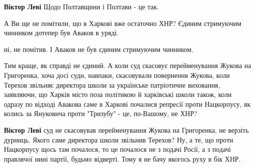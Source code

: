 \begin{itemize}
\begin{itemize}
 
\textbf{Віктор Леві} Щодо Полтавщини і Полтави - це так.
\end{itemize}

 

А Ви ще не помітили, що в Харкові вже остаточно ХНР? Єдиним стримуючим чинником
дотепер був Аваков в уряді.

\begin{itemize}
 
ні, не помітив. І Аваков не був єдиним стримуючим чинником.

 

Тим краще, як справді не єдиний. А коли суд скасовує перейменування Жукова на
Григоренка, хоча досі суди, навпаки, скасовували повернення Жукова, коли
Терехов звільняє директора школи за українське патріотичне виховання,
заявляючи, що Харків місто поза політикою й харківські школи також, коли одразу
по відході Авакова саме в Харкові почалися репресії проти Нацкорпусу, як колись
за Януковича проти "Тризубу" - це, по-Вашому, не ХНР?

 
\textbf{Віктор Леві} суд не скасовував перейменування Жукова на Григоренка, не
верзіть дурниць. Якого саме директора школи звільнив Терехов? Ну, а те, що
проти Нацкорпусу щось там почалося, то це почалося не з подачі Росії, а з
подачі правлячої нині партії, будьмо відверті. Тому я не бачу якогось руху в
бік ХНР.


\end{itemize}
\end{itemize}
